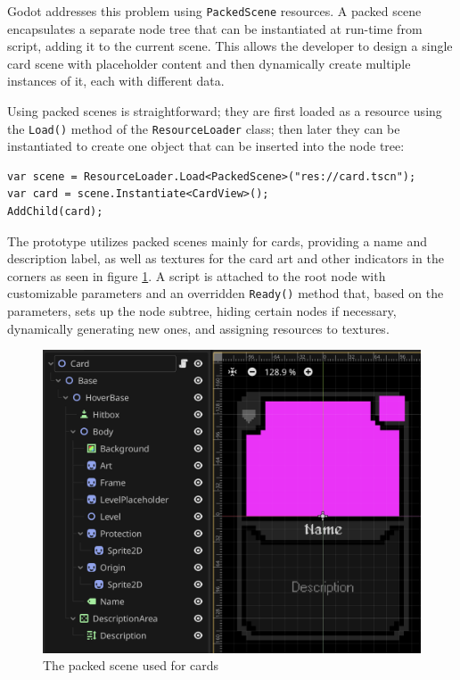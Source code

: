 Godot addresses this problem using \verb|PackedScene| resources. A packed scene encapsulates a separate node tree that can be instantiated at run-time from script, adding it to the current scene. This allows the developer to design a single card scene with placeholder content and then dynamically create multiple instances of it, each with different data.

Using packed scenes is straightforward; they are first loaded as a resource using the \verb|Load()| method of the \verb|ResourceLoader| class; then later they can be instantiated to create one object that can be inserted into the node tree:

\begin{verbatim}
var scene = ResourceLoader.Load<PackedScene>("res://card.tscn");
var card = scene.Instantiate<CardView>();
AddChild(card);
\end{verbatim}

The prototype utilizes packed scenes mainly for cards, providing a name and description label, as well as textures for the card art and other indicators in the corners as seen in figure \ref{figure:card_scene}. A script is attached to the root node with customizable parameters and an overridden \verb|Ready()| method that, based on the parameters,  sets up the node subtree, hiding certain nodes if necessary, dynamically generating new ones, and assigning resources to textures.

\begin{figure}[h]
    \centering
    \includegraphics[width=12cm]{images/card_packed_scene.png}
    \caption{The packed scene used for cards}
    \label{figure:card_scene}
\end{figure}


